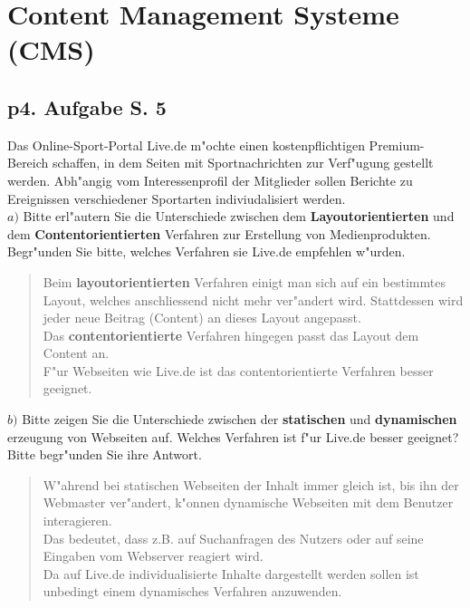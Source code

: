 \section{Content Management Systeme (CMS)}

\subsection{p4. Aufgabe S. 5}
Das Online-Sport-Portal Live.de m"ochte einen kostenpflichtigen Premium-Bereich schaffen, in dem Seiten mit Sportnachrichten zur Verf"ugung gestellt werden.
Abh"angig vom Interessenprofil der Mitglieder sollen Berichte zu Ereignissen verschiedener Sportarten indiviudalisiert werden.\\

\noindent
$a)$ Bitte erl"autern Sie die Unterschiede zwischen dem \textbf{Layoutorientierten} und dem \textbf{Contentorientierten} Verfahren zur Erstellung von Medienprodukten.
Begr"unden Sie bitte, welches Verfahren sie Live.de empfehlen w"urden.\\

\begin{quote}
    Beim \textbf{layoutorientierten} Verfahren einigt man sich auf ein bestimmtes Layout, welches anschliessend nicht mehr ver"andert wird.
    Stattdessen wird jeder neue Beitrag (Content) an dieses Layout angepasst.\\
    Das \textbf{contentorientierte} Verfahren hingegen passt das Layout dem Content an.\\

    \noindent
    F"ur Webseiten wie Live.de ist das contentorientierte Verfahren besser geeignet.
\end{quote}




\noindent
$b)$ Bitte zeigen Sie die Unterschiede zwischen der \textbf{statischen} und \textbf{dynamischen} erzeugung von Webseiten auf.
Welches Verfahren ist f"ur Live.de besser geeignet?
Bitte begr"unden Sie ihre Antwort.\\
\begin{quote}
    W"ahrend bei statischen Webseiten der Inhalt immer gleich ist, bis ihn der Webmaster ver"andert, k"onnen dynamische Webseiten  mit dem Benutzer interagieren.\\
    Das bedeutet, dass z.B. auf Suchanfragen des Nutzers oder auf seine Eingaben vom Webserver reagiert wird.\\

    \noindent
    Da auf Live.de individualisierte Inhalte dargestellt werden sollen ist unbedingt einem dynamisches Verfahren anzuwenden.
\end{quote}



